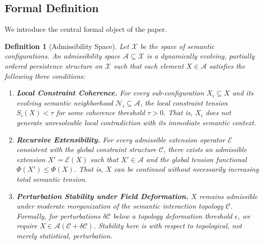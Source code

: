 \documentclass[11pt, a4paper]{article}
\theoremstyle{srn}
\newtheorem{definition}{Definition}[section]
\theoremstyle{srnremark}
\newcommand{\Aspace}{\mathcal{A}}           %
\newcommand{\Cstruct}{\mathcal{C}}           %
\newcommand{\Nhd}{\mathcal{N}}           %
\newcommand{\Phiten}{\varPhi}            %
\begin{document}
\subsection{Formal Definition}

We introduce the central formal object of the paper.

\begin{definition}[Admissibility Space]
\label{def:admissibility}
Let $\mathcal{X}$ be the space of semantic configurations.
An \emph{admissibility space} $\Aspace \subseteq \mathcal{X}$ is a
dynamically evolving, partially ordered persistence structure on
$\mathcal{X}$ such that each element $X \in \Aspace$ satisfies the
following three conditions:

\begin{enumerate}
  \item[\textbf{(C1)}] \textbf{Local Constraint Coherence.}
    For every sub-configuration $X_i \subseteq X$ and its evolving
    semantic neighborhood $\Nhd_i \subseteq \Aspace$, the local constraint
    tension $S_i(X) < \tau$ for some coherence threshold $\tau > 0$.
    That is, $X_i$ does not generate unresolvable local contradiction
    with its immediate semantic context.

  \item[\textbf{(C2)}] \textbf{Recursive Extensibility.}
    For every admissible extension operator $\mathcal{E}$ consistent
    with the global constraint structure $\Cstruct$, there exists an
    admissible extension $X' = \mathcal{E}(X)$ such that $X'
    \in \Aspace$ and the global tension functional $\Phiten(X') \leq \Phiten(X)$.
    That is, $X$ can be continued without necessarily increasing total
    semantic tension.

  \item[\textbf{(C3)}] \textbf{Perturbation Stability under Field
    Deformation.}
    $X$ remains admissible under moderate reorganization of the
    semantic interaction topology $\Cstruct$.
    Formally, for perturbations $\delta\Cstruct$ below a topology deformation
    threshold $\epsilon$, we require $X \in \Aspace(\Cstruct + \delta\Cstruct)$.
    Stability here is with respect to \emph{topological}, not merely
    statistical, perturbation.
\end{enumerate}
\end{definition}
\end{document}
